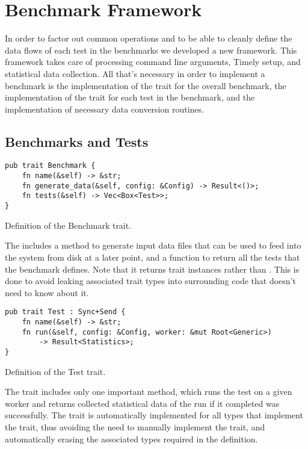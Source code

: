 \section{Benchmark Framework}
In order to factor out common operations and to be able to cleanly define the data flows of each test in the benchmarks we developed a new framework. This framework takes care of processing command line arguments, Timely setup, and statistical data collection. All that's necessary in order to implement a benchmark is the implementation of the  trait for the overall benchmark, the implementation of the  trait for each test in the benchmark, and the implementation of necessary data conversion routines.

\subsection{Benchmarks and Tests}
\begin{listing}[H]
\begin{verbatim}
pub trait Benchmark {
    fn name(&self) -> &str;
    fn generate_data(&self, config: &Config) -> Result<()>;
    fn tests(&self) -> Vec<Box<Test>>;
}
\end{verbatim}
  \caption{Definition of the Benchmark trait.}
  \label{lst:benchmark-trait}
\end{listing}

The  includes a method to generate input data files that can be used to feed into the system from disk at a later point, and a function to return all the tests that the benchmark defines. Note that it returns  trait instances rather than . This is done to avoid leaking associated trait types into surrounding code that doesn't need to know about it.

\begin{listing}[H]
\begin{verbatim}
pub trait Test : Sync+Send {
    fn name(&self) -> &str;
    fn run(&self, config: &Config, worker: &mut Root<Generic>)
        -> Result<Statistics>;
}
\end{verbatim}
  \caption{Definition of the Test trait.}
  \label{lst:test-trait}
\end{listing}

The  trait includes only one important method, which runs the test on a given worker and returns collected statistical data of the run if it completed was successfully. The  trait is automatically implemented for all types that implement the  trait, thus avoiding the need to manually implement the  trait, and automatically erasing the associated types required in the  definition.


